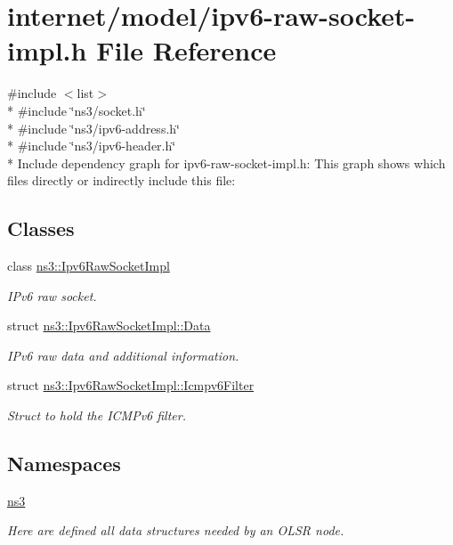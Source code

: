 \hypertarget{ipv6-raw-socket-impl_8h}{}\section{internet/model/ipv6-\/raw-\/socket-\/impl.h File Reference}
\label{ipv6-raw-socket-impl_8h}
{\ttfamily \#include $<$list$>$}\\*
{\ttfamily \#include \char`\"{}ns3/socket.\+h\char`\"{}}\\*
{\ttfamily \#include \char`\"{}ns3/ipv6-\/address.\+h\char`\"{}}\\*
{\ttfamily \#include \char`\"{}ns3/ipv6-\/header.\+h\char`\"{}}\\*
Include dependency graph for ipv6-\/raw-\/socket-\/impl.h\+:
This graph shows which files directly or indirectly include this file\+:
\subsection*{Classes}
\begin{DoxyCompactItemize}
\item 
class \hyperlink{classns3_1_1Ipv6RawSocketImpl}{ns3\+::\+Ipv6\+Raw\+Socket\+Impl}
\begin{DoxyCompactList}\small\item\em I\+Pv6 raw socket. \end{DoxyCompactList}\item 
struct \hyperlink{structns3_1_1Ipv6RawSocketImpl_1_1Data}{ns3\+::\+Ipv6\+Raw\+Socket\+Impl\+::\+Data}
\begin{DoxyCompactList}\small\item\em I\+Pv6 raw data and additional information. \end{DoxyCompactList}\item 
struct \hyperlink{structns3_1_1Ipv6RawSocketImpl_1_1Icmpv6Filter}{ns3\+::\+Ipv6\+Raw\+Socket\+Impl\+::\+Icmpv6\+Filter}
\begin{DoxyCompactList}\small\item\em Struct to hold the I\+C\+M\+Pv6 filter. \end{DoxyCompactList}\end{DoxyCompactItemize}
\subsection*{Namespaces}
\begin{DoxyCompactItemize}
\item 
 \hyperlink{namespacens3}{ns3}
\begin{DoxyCompactList}\small\item\em Here are defined all data structures needed by an O\+L\+SR node. \end{DoxyCompactList}\end{DoxyCompactItemize}
